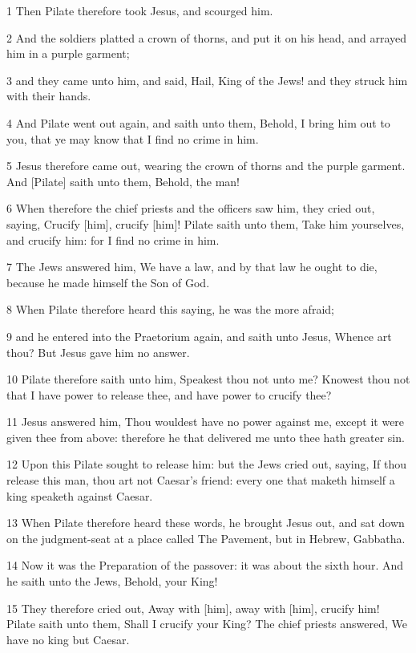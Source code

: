 \par 1 Then Pilate therefore took Jesus, and scourged him.
\par 2 And the soldiers platted a crown of thorns, and put it on his head, and arrayed him in a purple garment;
\par 3 and they came unto him, and said, Hail, King of the Jews! and they struck him with their hands.
\par 4 And Pilate went out again, and saith unto them, Behold, I bring him out to you, that ye may know that I find no crime in him.
\par 5 Jesus therefore came out, wearing the crown of thorns and the purple garment. And [Pilate] saith unto them, Behold, the man!
\par 6 When therefore the chief priests and the officers saw him, they cried out, saying, Crucify [him], crucify [him]! Pilate saith unto them, Take him yourselves, and crucify him: for I find no crime in him.
\par 7 The Jews answered him, We have a law, and by that law he ought to die, because he made himself the Son of God.
\par 8 When Pilate therefore heard this saying, he was the more afraid;
\par 9 and he entered into the Praetorium again, and saith unto Jesus, Whence art thou? But Jesus gave him no answer.
\par 10 Pilate therefore saith unto him, Speakest thou not unto me? Knowest thou not that I have power to release thee, and have power to crucify thee?
\par 11 Jesus answered him, Thou wouldest have no power against me, except it were given thee from above: therefore he that delivered me unto thee hath greater sin.
\par 12 Upon this Pilate sought to release him: but the Jews cried out, saying, If thou release this man, thou art not Caesar's friend: every one that maketh himself a king speaketh against Caesar.
\par 13 When Pilate therefore heard these words, he brought Jesus out, and sat down on the judgment-seat at a place called The Pavement, but in Hebrew, Gabbatha.
\par 14 Now it was the Preparation of the passover: it was about the sixth hour. And he saith unto the Jews, Behold, your King!
\par 15 They therefore cried out, Away with [him], away with [him], crucify him! Pilate saith unto them, Shall I crucify your King? The chief priests answered, We have no king but Caesar.
